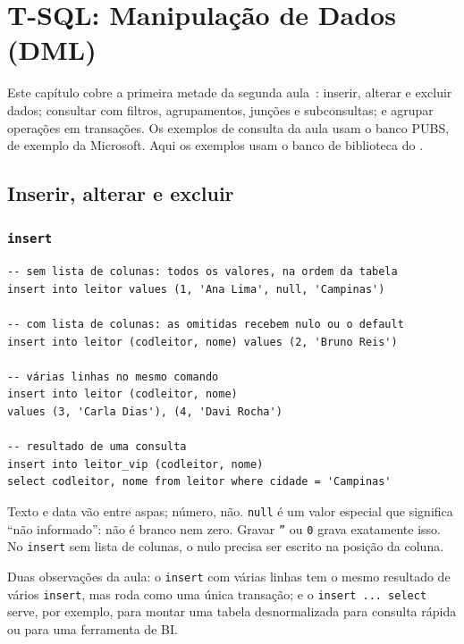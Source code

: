 \setchapterpreamble[u]{\margintoc}
\chapter{T-SQL: Manipulação de Dados (DML)}

Este capítulo cobre a primeira metade da segunda
aula~\cite{BaiocoCET615}: inserir, alterar e excluir dados; consultar
com filtros, agrupamentos, junções e subconsultas; e agrupar operações em
transações. Os exemplos de consulta da aula usam o banco PUBS, de
exemplo da Microsoft. Aqui os exemplos usam o banco de biblioteca do
.

\section{Inserir, alterar e excluir}

\subsection{\texttt{insert}}

\begin{lstlisting}
-- sem lista de colunas: todos os valores, na ordem da tabela
insert into leitor values (1, 'Ana Lima', null, 'Campinas')

-- com lista de colunas: as omitidas recebem nulo ou o default
insert into leitor (codleitor, nome) values (2, 'Bruno Reis')

-- várias linhas no mesmo comando
insert into leitor (codleitor, nome)
values (3, 'Carla Dias'), (4, 'Davi Rocha')

-- resultado de uma consulta
insert into leitor_vip (codleitor, nome)
select codleitor, nome from leitor where cidade = 'Campinas'
\end{lstlisting}

Texto e data vão entre aspas; número, não. \texttt{null} é um valor
especial que significa ``não informado'': não é branco nem zero. Gravar
\texttt{''} ou \texttt{0} grava exatamente isso. No \texttt{insert} sem
lista de colunas, o nulo precisa ser escrito na posição da coluna.

Duas observações da aula: o \texttt{insert}
com várias linhas tem o mesmo resultado de vários \texttt{insert}, mas
roda como uma única transação; e o \texttt{insert ... select} serve, por
exemplo, para montar uma tabela desnormalizada para consulta rápida ou
para uma ferramenta de BI.

